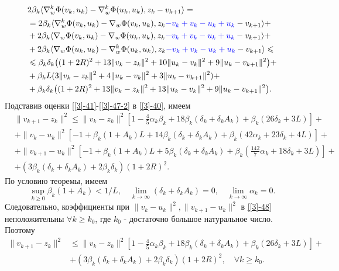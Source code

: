 \begin{equation}
\label{[3]-47-2}
\begin{aligned}
&2\beta_k\langle \nabla_w^k\Phi(v_k,u_k)-\nabla_w^k\Phi(u_k,u_k),z_k-v_{k+1} \rangle=\\
&=2\beta_k\langle \nabla_w^k\Phi(v_k,u_k)-\nabla_w\Phi(v_k,u_k),z_k\textcolor{blue}{-v_k+v_k-u_k+u_k}-v_{k+1} \rangle+\\
&+2\beta_k\langle \nabla_w\Phi(v_k,u_k)-\nabla_w\Phi(u_k,u_k),z_k\textcolor{blue}{-v_k+v_k-u_k+u_k}-v_{k+1}  \rangle+\\
&+2\beta_k\langle \nabla_w\Phi(u_k,u_k)-\nabla_w^k\Phi(u_k,u_k),z_k\textcolor{blue}{-v_k+v_k-u_k+u_k}-v_{k+1}  \rangle\leqslant\\
&\leqslant \beta_k\delta_k\big((1+2R)^2+13\|v_k-z_k\|^2+10\|u_k-v_k\|^2+9\|u_k-v_{k+1}\|^2 \big)+\\
&+\beta_kL(3\|v_k-z_k\|^2+4\|u_k-v_k\|^2+3\|u_k-v_{k+1}\|^2)+\\
&+\beta_k\delta_k\big((1+2R)^2+13\|v_k-z_k\|^2+13\|u_k-v_k\|^2+9\|u_k-v_{k+1}\|^2 \big).
\end{aligned}
\end{equation}
Подставив оценки \eqref{[3]-41}-\eqref{[3]-47-2} в \eqref{[3]-40}, имеем
\begin{equation}
\label{[3]-48}
\begin{aligned}
&\|v_{k+1}-z_k\|^2\leqslant \|v_k-z_k\|^2\left[1-\frac{4}{5}\alpha_k\beta_k+18\beta_k(\delta_k+\delta_kA_k)+\beta_k(26\delta_k+3L)\right]+\\
&+\|v_k-u_k\|^2\left[-1+\beta_k(1+A_k)L+14\beta_k(\delta_k+\delta_kA_k)+\beta_k(42\alpha_k+23\delta_k+4L)\right]+\\
&+\|v_{k+1}-u_k\|^2\left[-1+\beta_k(1+A_k)L+5\beta_k(\delta_k+\delta_kA_k)+\beta_k(\frac{142}{7}\alpha_k+18\delta_k+3L)\right]+\\
&+(3\beta_k(\delta_k+\delta_kA_k)+2\beta_k\delta_k)(1+2R)^2.
\end{aligned}
\end{equation}
По условию теоремы, имеем
\begin{equation*}
\sup_{k\geqslant 0}\beta_k(1+A_k)<1/L,\quad \lim_{k\rightarrow\infty}(\delta_k+\delta_k A_k)=0,\quad \lim_{k\to \infty} \alpha_k=0.
\end{equation*}
Следовательно, коэффициенты при $\|v_k-u_k\|^2,\|v_{k+1}-u_k\|^2$ в \eqref{[3]-48} неположительны $\forall k\geqslant k_0$, где $k_0$ - достаточно большое натуральное число. Поэтому
\begin{equation}
\label{[3]-49}
\begin{aligned}
\|v_{k+1}-z_k\|^2&\leqslant \|v_k-z_k\|^2\left[1-\frac{4}{5}\alpha_k\beta_k+18\beta_k(\delta_k+\delta_kA_k)+\beta_k(26\delta_k+3L)\right]+\\
&+(3\beta_k(\delta_k+\delta_kA_k)+2\beta_k\delta_k)(1+2R)^2,\quad \forall k\geqslant k_0.
\end{aligned}
\end{equation}
